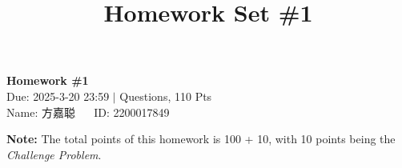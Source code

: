 \documentclass[11pt]{article}
\title{Homework Set \#1}
\newcommand\1{\mathds{1}}
\begin{document}
    \pagestyle{fancy}
    \chead{\kaishu }
    \fancyfoot[R]{} 
    \fancyfoot[C]{\thepage\ /\ \pageref{LastPage} \\ \textcolor{lightgray}{Last Compile: \today}}

    \begin{center}
        {\LARGE \bf Homework \#1}\\
        {Due: 2025-3-20 23:59 \quad$|$ Questions, 110 Pts}\\
        {Name: \kaishu 方嘉聪 $\quad$ ID: 2200017849}
    \end{center}

    \textbf{Note: }The total points of this homework is 100 + 10, with 10 points being the \textit{Challenge Problem}.  

    
    \clearpage
    
    \clearpage
    
    \clearpage
    
    \clearpage 
    
    \clearpage
    
    \clearpage
    
    \clearpage
    
\end{document}

